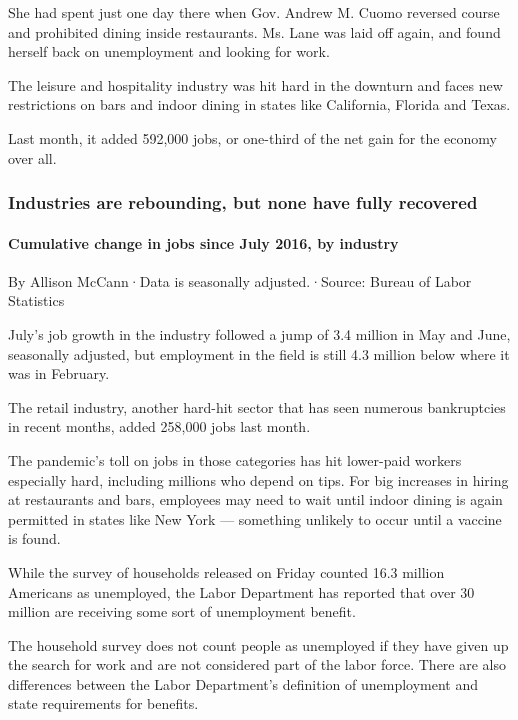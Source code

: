 She had spent just one day there when Gov. Andrew M. Cuomo reversed
course and prohibited dining inside restaurants. Ms. Lane was laid off
again, and found herself back on unemployment and looking for work.

The leisure and hospitality industry was hit hard in the downturn and
faces new restrictions on bars and indoor dining in states like
California, Florida and Texas.

Last month, it added 592,000 jobs, or one-third of the net gain for the
economy over all.

\hypertarget{industries-are-rebounding-but-none-have-fully-recovered}{%
\subsubsection{Industries are rebounding, but none have fully
recovered}\label{industries-are-rebounding-but-none-have-fully-recovered}}

\hypertarget{cumulative-change-in-jobs-since-july-2016-by-industry}{%
\paragraph{Cumulative change in jobs since July 2016, by
industry}\label{cumulative-change-in-jobs-since-july-2016-by-industry}}

By Allison McCann·Data is seasonally adjusted.·Source: Bureau of Labor
Statistics

July's job growth in the industry followed a jump of 3.4 million in May
and June, seasonally adjusted, but employment in the field is still 4.3
million below where it was in February.

The retail industry, another hard-hit sector that has seen numerous
bankruptcies in recent months, added 258,000 jobs last month.

The pandemic's toll on jobs in those categories has hit lower-paid
workers especially hard, including millions who depend on tips. For big
increases in hiring at restaurants and bars, employees may need to wait
until indoor dining is again permitted in states like New York ---
something unlikely to occur until a vaccine is found.

While the survey of households released on Friday counted 16.3 million
Americans as unemployed, the Labor Department has reported that over 30
million are receiving some sort of unemployment benefit.

The household survey does not count people as unemployed if they have
given up the search for work and are not considered part of the labor
force. There are also differences between the Labor Department's
definition of unemployment and state requirements for benefits.

